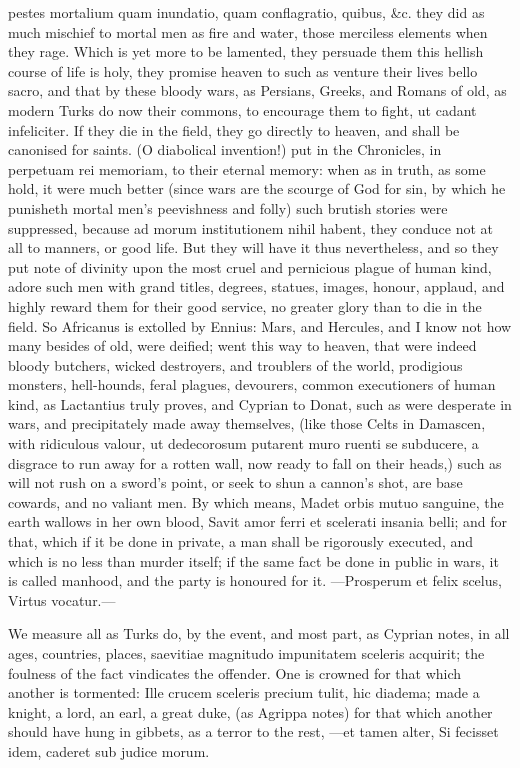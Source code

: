 {pestes mortalium quam inundatio, quam conflagratio, quibus, \&c. they
did as much mischief to mortal men as fire and water, those merciless
elements when they rage. Which is yet more to be lamented, they
persuade them this hellish course of life is holy, they promise heaven
to such as venture their lives bello sacro, and that by these bloody
wars, as Persians, Greeks, and Romans of old, as modern Turks do now
their commons, to encourage them to fight, ut cadant infeliciter. If
they die in the field, they go directly to heaven, and shall be
canonised for saints. (O diabolical invention!) put in the Chronicles,
in perpetuam rei memoriam, to their eternal memory: when as in truth,
as some hold, it were much better (since wars are the scourge of
God for sin, by which he punisheth mortal men's peevishness and folly)
such brutish stories were suppressed, because ad morum institutionem
nihil habent, they conduce not at all to manners, or good life. But
they will have it thus nevertheless, and so they put note of
divinity upon the most cruel and pernicious plague of human kind,
adore such men with grand titles, degrees, statues, images,
honour, applaud, and highly reward them for their good service, no
greater glory than to die in the field. So Africanus is extolled by
Ennius: Mars, and Hercules, and I know not how many besides of
old, were deified; went this way to heaven, that were indeed bloody
butchers, wicked destroyers, and troublers of the world, prodigious
monsters, hell-hounds, feral plagues, devourers, common executioners of
human kind, as Lactantius truly proves, and Cyprian to Donat, such as
were desperate in wars, and precipitately made away themselves, (like
those Celts in Damascen, with ridiculous valour, ut dedecorosum
putarent muro ruenti se subducere, a disgrace to run away for a rotten
wall, now ready to fall on their heads,) such as will not rush on a
sword's point, or seek to shun a cannon's shot, are base cowards, and
no valiant men. By which means, Madet orbis mutuo sanguine, the earth
wallows in her own blood,
Savit amor ferri et scelerati insania belli; and for that, which
if it be done in private, a man shall be rigorously executed, and
which is no less than murder itself; if the same fact be done in public
in wars, it is called manhood, and the party is honoured for it.
---Prosperum et felix scelus,
Virtus vocatur.---

We measure all as Turks do, by the event, and most part, as Cyprian
notes, in all ages, countries, places, saevitiae magnitudo impunitatem
sceleris acquirit; the foulness of the fact vindicates the offender.
One is crowned for that which another is tormented: Ille crucem
sceleris precium tulit, hic diadema; made a knight, a lord, an earl, a
great duke, (as Agrippa notes) for that which another should have
hung in gibbets, as a terror to the rest,
---et tamen alter,
Si fecisset idem, caderet sub judice morum.

}
